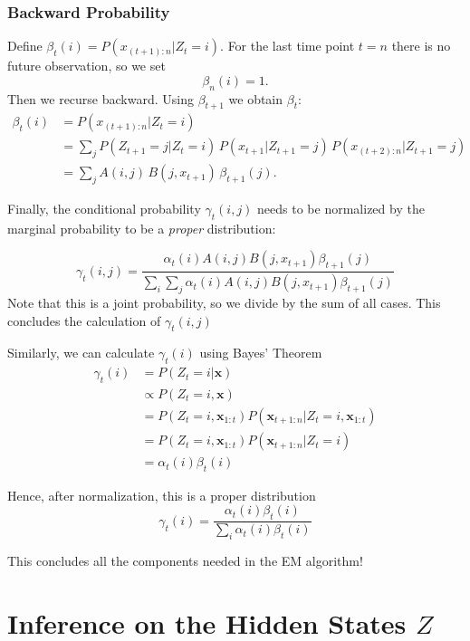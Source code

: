 \documentclass[
]{book}
\begin{document}
\subsubsection*{Backward Probability}\label{backward-probability}

Define \(\beta_t(i) = P(x_{(t+1):n}|Z_t=i)\). For the last time point \(t=n\) there is no future observation, so we set
\[\beta_n(i)=1.\]
Then we recurse backward. Using \(\beta_{t+1}\) we obtain \(\beta_t\):
\begin{align*}
\beta_t(i) &= P(x_{(t+1):n}| Z_t=i)\\
&= \sum_j P(Z_{t+1}=j | Z_t=i)\, P(x_{t+1}|Z_{t+1}=j)\, P(x_{(t+2):n}|Z_{t+1}=j)\\
&= \sum_j  A(i,j)\, B(j, x_{t+1})\, \beta_{t+1}(j).
\end{align*}

Finally, the conditional probability \(\gamma_t(i,j)\) needs to be normalized by the marginal probability to be a \emph{proper} distribution:

\[\gamma_t(i,j) = \frac{\alpha_t(i) A(i,j) B(j, x_{t+1}) \beta_{t+1}(j)}{\sum_i \sum_j \alpha_t(i) A(i,j) B(j, x_{t+1}) \beta_{t+1}(j)}\]
Note that this is a joint probability, so we divide by the sum of all cases. This concludes the calculation of \(\gamma_t(i,j)\)

Similarly, we can calculate \(\gamma_t(i)\) using Bayes' Theorem
\begin{align*}
\gamma_t(i) &= P(Z_t=i|\mathbf{x})\\
&\propto P(Z_t=i,\mathbf{x})\\
&= P(Z_t=i, \mathbf{x}_{1:t}) P(\mathbf{x}_{t+1:n} |Z_t=i, \mathbf{x}_{1:t})\\
&= P(Z_t=i, \mathbf{x}_{1:t}) P(\mathbf{x}_{t+1:n} |Z_t=i)\\
&= \alpha_t(i) \beta_t(i)
\end{align*}

Hence, after normalization, this is a proper distribution
\[\gamma_t(i) = \frac{\alpha_t(i) \beta_t(i)}{\sum_i \alpha_t(i) \beta_t(i)}\]

This concludes all the components needed in the EM algorithm!

\section{\texorpdfstring{Inference on the Hidden States \(Z\)}{Inference on the Hidden States Z}}\label{inference-on-the-hidden-states-z}
\end{document}
